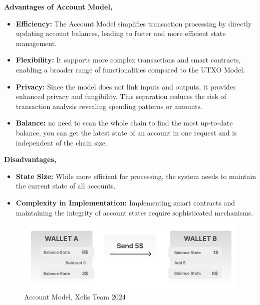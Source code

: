 \documentclass[10pt,a4paper,twocolumn]{article}
\begin{document}
\textbf{Advantages of Account Model,} \\
\begin{itemize}
\item \textbf{Efficiency:} The Account Model simplifies transaction processing by directly updating account balances, leading to faster and more efficient state management.\\

\item \textbf{Flexibility:} It supports more complex transactions and smart contracts, enabling a broader range of functionalities compared to the UTXO Model.\\

\item \textbf{Privacy:} Since the model does not link inputs and outputs, it provides enhanced privacy and fungibility. This separation reduces the risk of transaction analysis revealing spending patterns or amounts.\\

\item \textbf{Balance:} no need to scan the whole chain to find the most up-to-date balance, you can get the latest state of an account in one request and is independent of the chain size.\\
\end{itemize}
\textbf{Disadvantages,} \\
\begin{itemize}
\item \textbf{State Size:} While more efficient for processing, the system needs to maintain the current state of all accounts. 

\item \textbf{Complexity in Implementation:} Implementing smart contracts and maintaining the integrity of account states require sophisticated mechanisms.\\
\end{itemize}
\begin{figure}
    \centering
    \includegraphics[width=0.9\linewidth]{Frame 2.png}
    \caption{Account Model, Xelis Team 2024}
\end{figure}
\end{document}
